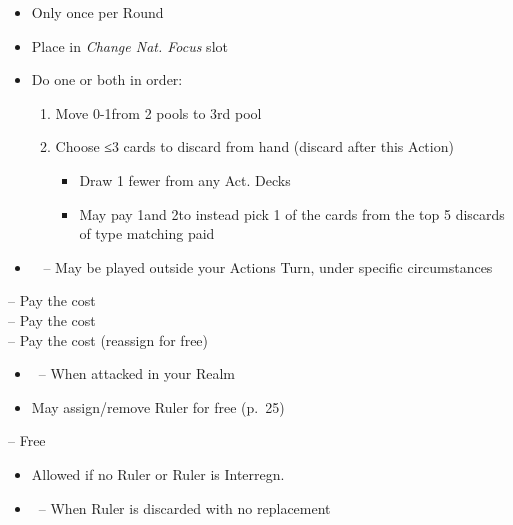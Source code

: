 \documentclass[10pt]{article}
\begin{document}
\begin{itemize}
	\item Only once per Round
	\item Place \cube in \emph{Change Nat. Focus} slot
	\item Do one or both in order:
	\begin{enumerate}
		\item Move 0-1\monarchpower from 2 pools to 3rd pool
		\item Choose ≤3 cards to discard from hand (discard after this Action)
		\begin{itemize}
			\item Draw 1 fewer from any Act. Decks
			\item May pay 1\monarchpower and 2\ducats to instead pick 1 of the cards from the top 5 discards of type matching paid \monarchpower
		\end{itemize}
	\end{enumerate}
\end{itemize}

\begin{itemize}
	\item \reaction~ -- May be played outside your Actions Turn, under specific circumstances
\end{itemize}
 -- Pay the \ducat cost\\
 -- Pay the \milpower cost\\
 -- Pay the \milpower cost (reassign for free)\\
\begin{itemize}
	\item \reaction~-- When attacked in your Realm
	\item May assign/remove Ruler for free (p.~25)
\end{itemize}
 -- Free
\begin{itemize}
	\item Allowed if no Ruler or Ruler is \dprime Interregn.\dprime
	\item \reaction~-- When Ruler is discarded with no replacement
\end{itemize}
\end{document}
